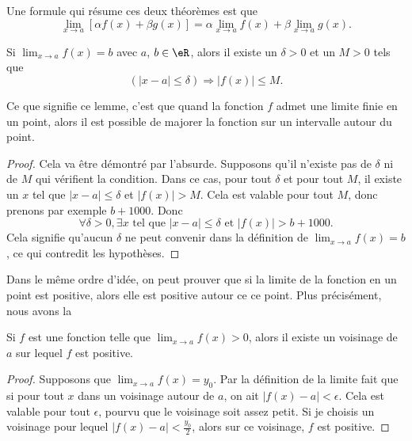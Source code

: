 Une formule qui résume ces deux théorèmes est que
\begin{equation}    \label{EqLimLinRes}
    \lim_{x\to a}[\alpha f(x)+\beta g(x)]=\alpha\lim_{x\to a}f(x)+\beta\lim_{x\to a}g(x).
\end{equation}

\begin{lemma}       \label{LemLimMajorableVois}
    Si $\lim_{x\to a}f(x)=b$ avec $a$, $b\in\eR$, alors il existe un $\delta>0$ et un $M>0$ tels que
    \[
        (| x-a |\leq\delta)\Rightarrow | f(x) |\leq M.
    \]
\end{lemma}

Ce que signifie ce lemme, c'est que quand la fonction $f$ admet une limite finie en un point, alors il est possible de majorer la fonction sur un intervalle autour du point.

\begin{proof}
    Cela va être démontré par l'absurde. Supposons qu'il n'existe pas de $\delta$ ni de $M$ qui vérifient la condition. Dans ce cas, pour tout $\delta$ et pour tout $M$, il existe un $x$ tel que $| x-a |\leq\delta$ et $| f(x) |> M$. Cela est valable pour tout $M$, donc prenons par exemple $b+1000$. Donc
    \begin{equation}
    \forall\delta>0,\exists x\text{ tel que } | x-a |\leq\delta\text{ et }| f(x) |>b+1000.
    \end{equation}
    Cela signifie qu'aucun $\delta$ ne peut convenir dans la définition de $\lim_{x\to a}f(x)=b$, ce qui contredit les hypothèses.
\end{proof}

Dans le même ordre d'idée, on peut prouver que si la limite de la fonction en un point est positive, alors elle est positive autour ce ce point. Plus précisément, nous avons la
\begin{proposition} \label{PropoLimPosFPos}
    Si $f$ est une fonction telle que $\lim_{x\to a}f(x)>0$, alors il existe un voisinage de $a$ sur lequel $f$ est positive.
\end{proposition}

\begin{proof}
    Supposons que $\lim_{x\to a}f(x)=y_0$. Par la définition de la limite fait que si pour tout $x$ dans un voisinage autour de $a$, on ait $| f(x)-a |<\epsilon$. Cela est valable pour tout $\epsilon$, pourvu que le voisinage soit assez petit. Si je choisis un voisinage pour lequel $| f(x)-a |<\frac{ y_0 }{ 2 }$, alors sur ce voisinage, $f$ est positive.
\end{proof}

